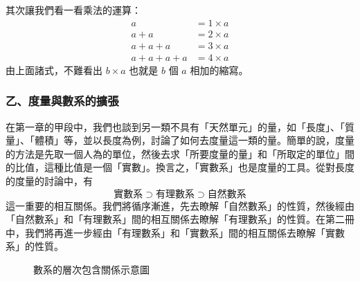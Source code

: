 其次讓我們看一看乘法的運算：
\begin{align*}
  a &= 1 \times a \\
  a+a &= 2 \times a \\
  a+a+a &= 3 \times a \\
  a+a+a+a &= 4 \times a
\end{align*}
由上面諸式，不難看出 $b \times a$ 也就是 $b$ 個 $a$ 相加的縮寫。

\subsubsection*{乙、度量與數系的擴張}\label{subsec:measure_expansion}

在第一章的甲段中，我們也談到另一類不具有「天然單元」的量，如「長度」、「質量」、「體積」等，並以長度為例，討論了如何去度量這一類的量。簡單的說，度量的方法是先取一個人為的單位，然後去求「所要度量的量」和「所取定的單位」間的比值，這種比值是一個「實數」。換言之，「實數系」也是度量的工具。從對長度的度量的討論中，有
\begin{equation}\label{eq:number_systems_hierarchy}
  \text{實數系} \supset \text{有理數系} \supset \text{自然數系}
\end{equation}
這一重要的相互關係。我們將循序漸進，先去瞭解「自然數系」的性質，然後經由「自然數系」和「有理數系」間的相互關係去瞭解「有理數系」的性質。在第二冊中，我們將再進一步經由「有理數系」和「實數系」間的相互關係去瞭解「實數系」的性質。

\begin{figure}[htbp]
\centering
{}
\caption{數系的層次包含關係示意圖}\label{fig:number_hierarchy}
\end{figure}

